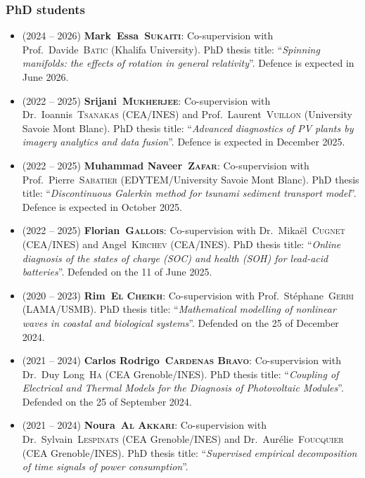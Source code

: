 \documentclass[final, a4paper, oneside, 12pt]{article}
\numberwithin{equation}{section}
\begin{document}
\subsubsection{PhD students}

\begin{itemize}

  \item (2024 -- 2026) \textbf{Mark~Essa~\textsc{Sukaiti}}: Co-supervision with Prof.~Davide~\textsc{Batic} (Khalifa University). PhD thesis title: ``\textit{Spinning manifolds: the effects of rotation in general relativity}''. Defence is expected in June 2026.

  \item (2022 -- 2025) \textbf{Srijani~\textsc{Mukherjee}}: Co-supervision with Dr.~Ioannis~\textsc{Tsanakas} (CEA/INES) and Prof.~Laurent~\textsc{Vuillon} (University Savoie Mont Blanc). PhD thesis title: ``\textit{Advanced diagnostics of PV plants by imagery analytics and data fusion}''. Defence is expected in December 2025.

  \item (2022 -- 2025) \textbf{Muhammad Naveer~\textsc{Zafar}}: Co-supervision with Prof.~Pierre~\textsc{Sabatier} (EDYTEM/University Savoie Mont Blanc). PhD thesis title: ``\textit{Discontinuous Galerkin method for tsunami sediment transport model}''. Defence is expected in October 2025.

  \item (2022 -- 2025) \textbf{Florian~\textsc{Gallois}}: Co-supervision with Dr.~Mika\"el~\textsc{Cugnet} (CEA/INES) and Angel~\textsc{Kirchev} (CEA/INES). PhD thesis title: ``\textit{Online diagnosis of the states of charge (SOC) and health (SOH) for lead-acid batteries}''. Defended on the 11 of June 2025.

  \item (2020 -- 2023) \textbf{Rim~\textsc{El Cheikh}}: Co-supervision with Prof.~St\'ephane~\textsc{Gerbi} (LAMA/USMB). PhD thesis title: ``\textit{Mathematical modelling of nonlinear waves in coastal and biological systems}''. Defended on the 25 of December 2024.

  \item (2021 -- 2024) \textbf{Carlos Rodrigo~\textsc{Cardenas Bravo}}: Co-supervision with Dr.~Duy Long~\textsc{Ha} (CEA Grenoble/INES). PhD thesis title: ``\textit{Coupling of Electrical and Thermal Models for the Diagnosis of Photovoltaic Modules}''. Defended on the 25 of September 2024.

  \item (2021 -- 2024) \textbf{Noura~\textsc{Al Akkari}}: Co-supervision with Dr.~Sylvain~\textsc{Lespinats} (CEA Grenoble/INES) and Dr.~Aur\'elie~\textsc{Foucquier} (CEA Grenoble/INES). PhD thesis title: ``\textit{Supervised empirical decomposition of time signals of power consumption}''.
  

\end{itemize}
\end{document}
